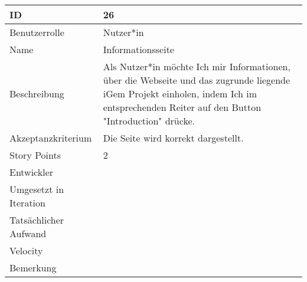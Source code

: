 \begin{tabularx}{\textwidth}{|p{}|X|}
	\hline
	ID & 26\\
	\hline
	Benutzerrolle & Nutzer*in\\
	\hline
	Name & Informationsseite\\
	\hline
	Beschreibung & Als Nutzer*in möchte Ich mir Informationen, über die Webseite und das zugrunde liegende iGem Projekt einholen, indem Ich im entsprechenden Reiter auf den Button "Introduction" drücke.\\
	\hline
	Akzeptanzkriterium & Die Seite wird korrekt dargestellt.\\
	\hline
	Story Points & 2\\
	\hlinet
	Entwickler & \\
	\hline
	Umgesetzt in Iteration & \\ 
	\hline
	Tatsächlicher Aufwand & \\
	\hline
	Velocity & \\
	\hline
	Bemerkung & \\
	\hline
\end{tabularx}
\vspace{20pt}
